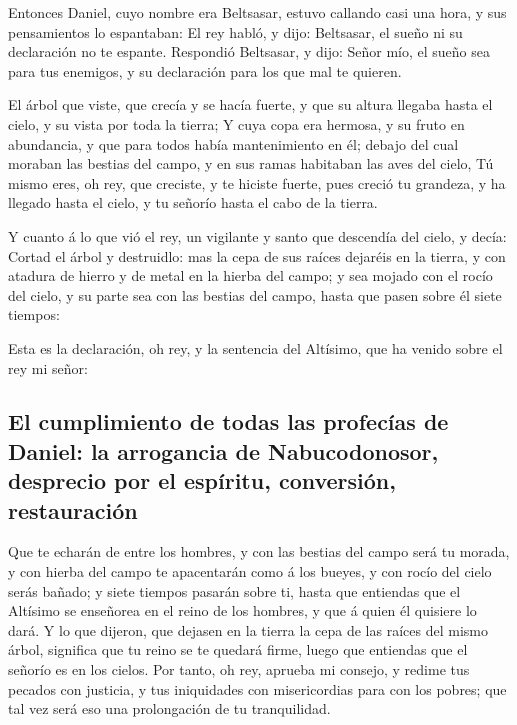  Entonces Daniel, cuyo nombre era Beltsasar, estuvo
callando casi una hora, y sus pensamientos lo espantaban: El rey habló,
y dijo: Beltsasar, el sueño ni su declaración no te espante. Respondió
Beltsasar, y dijo: Señor mío, el sueño sea para tus enemigos, y su
declaración para los que mal te quieren.

 El árbol que viste, que crecía y se hacía fuerte, y que su
altura llegaba hasta el cielo, y su vista por toda la tierra;
 Y cuya copa era hermosa, y su fruto en abundancia, y que
para todos había mantenimiento en él; debajo del cual moraban las
bestias del campo, y en sus ramas habitaban las aves del cielo,
 Tú mismo eres, oh rey, que creciste, y te hiciste fuerte,
pues creció tu grandeza, y ha llegado hasta el cielo, y tu señorío hasta
el cabo de la tierra.

 Y cuanto á lo que vió el rey, un vigilante y santo que
descendía del cielo, y decía: Cortad el árbol y destruidlo: mas la cepa
de sus raíces dejaréis en la tierra, y con atadura de hierro y de metal
en la hierba del campo; y sea mojado con el rocío del cielo, y su parte
sea con las bestias del campo, hasta que pasen sobre él siete tiempos:

 Esta es la declaración, oh rey, y la sentencia del
Altísimo, que ha venido sobre el rey mi señor:

\hypertarget{el-cumplimiento-de-todas-las-profecuxedas-de-daniel-la-arrogancia-de-nabucodonosor-desprecio-por-el-espuxedritu-conversiuxf3n-restauraciuxf3n}{%
\subsection{El cumplimiento de todas las profecías de Daniel: la
arrogancia de Nabucodonosor, desprecio por el espíritu, conversión,
restauración}\label{el-cumplimiento-de-todas-las-profecuxedas-de-daniel-la-arrogancia-de-nabucodonosor-desprecio-por-el-espuxedritu-conversiuxf3n-restauraciuxf3n}}

 Que te echarán de entre los hombres, y con las bestias del
campo será tu morada, y con hierba del campo te apacentarán como á los
bueyes, y con rocío del cielo serás bañado; y siete tiempos pasarán
sobre ti, hasta que entiendas que el Altísimo se enseñorea en el reino
de los hombres, y que á quien él quisiere lo dará.  Y lo
que dijeron, que dejasen en la tierra la cepa de las raíces del mismo
árbol, significa que tu reino se te quedará firme, luego que entiendas
que el señorío es en los cielos.  Por tanto, oh rey,
aprueba mi consejo, y redime tus pecados con justicia, y tus iniquidades
con misericordias para con los pobres; que tal vez será eso una
prolongación de tu tranquilidad.

